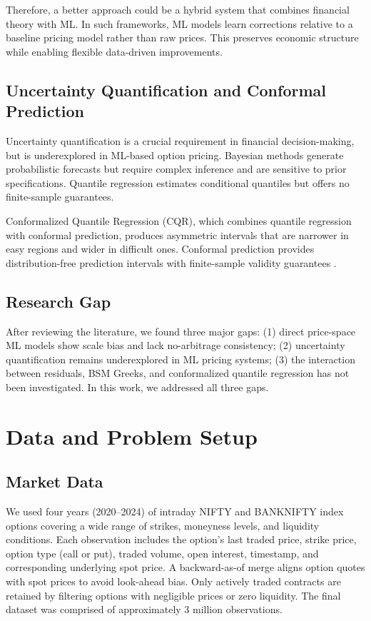 \documentclass[runningheads]{llncs}
\newcommand{\rev}[1]{{\color{blue}#1}}
\begin{document}
Therefore, a better approach could be a hybrid system that combines financial theory with ML. In such frameworks, ML models learn corrections relative to a baseline pricing model rather than raw prices. This preserves economic structure while enabling flexible data-driven improvements.

\subsection{Uncertainty Quantification and Conformal Prediction}

\rev{Uncertainty quantification is a crucial requirement in financial decision-making, but is underexplored in ML-based option pricing. Bayesian methods generate probabilistic forecasts but require complex inference and are sensitive to prior specifications. Quantile regression \cite{kuleshov2018accurate} estimates conditional quantiles but offers no finite-sample guarantees.}

 \rev{Conformalized Quantile Regression (CQR), which combines quantile regression with conformal prediction, produces asymmetric intervals that are narrower in easy regions and wider in difficult ones\cite{romano2019conformalized}.} Conformal prediction provides distribution-free prediction intervals with finite-sample validity guarantees \cite{vovk2005algorithmic,angelopoulos2021gentle}.

\subsection{Research Gap}

\rev{After reviewing the literature, we found three major gaps: (1) direct price-space ML models show scale bias and lack no-arbitrage consistency; (2) uncertainty quantification remains underexplored in ML pricing systems; (3) the interaction between residuals, BSM Greeks, and conformalized quantile regression has not been investigated. In this work, we addressed all three gaps.}


\section{Data and Problem Setup}

\subsection{Market Data}
We used four years (2020--2024) of intraday NIFTY and BANKNIFTY index options covering a wide range of strikes, moneyness levels, and liquidity conditions. Each observation includes the option's last traded price, strike price, option type (call or put), traded volume, open interest, timestamp, and corresponding underlying spot price. A backward-as-of merge aligns option quotes with spot prices to avoid look-ahead bias. Only actively traded contracts are retained by filtering options with negligible prices or zero liquidity. \rev{The final dataset was comprised of approximately 3 million observations.}
\end{document}

